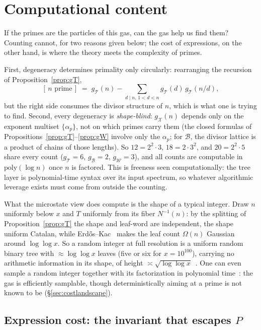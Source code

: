 \documentclass[11pt]{article}
\newcommand{\cT}{\mathcal{T}}   %
\newcommand{\cW}{\mathcal{W}}   %
\newcommand{\cB}{\mathcal{B}}   %
\numberwithin{equation}{section}
\theoremstyle{plain}
\theoremstyle{definition}
\theoremstyle{remark}
\begin{document}
\section{Computational content}\label{sec:comp}

If the primes are the particles of this gas, can the gas help us find them?
Counting cannot, for two reasons given below; the cost of expressions, on the other
hand, is where the theory meets the complexity of primes.

First, degeneracy determines
primality only circularly: rearranging the recursion of Proposition~\ref{prop:gT},
\[
[\,n \text{ prime}\,] \;=\; g_\cT(n) - \sum_{d \mid n,\, 1<d<n} g_\cT(d)\,g_\cT(n/d),
\]
but the right side consumes the divisor structure of $n$, which is what one is trying
to find. Second, every degeneracy is \emph{shape-blind}: $g_{\mathcal X}(n)$ depends
only on the exponent multiset $\{\alpha_p\}$, not on which primes carry them (the
closed formulas of Propositions~\ref{prop:gT}--\ref{prop:gW} involve only the
$\alpha_p$; for $\cB$, the divisor lattice is a product of chains of those lengths).
So $12 = 2^2\cdot 3$, $18 = 2\cdot 3^2$, and $20 = 2^2\cdot 5$ share every count
($g_\cT = 6$, $g_\cB = 2$, $g_\cW = 3$), and all counts are computable in
$\mathrm{poly}(\log n)$ once $n$ is factored. This is freeness seen computationally:
the tree layer is polynomial-time syntax over its input spectrum, so whatever
algorithmic leverage exists must come from outside the counting.

What the microstate view does compute is the shape of a typical integer. Draw
$n$ uniformly below $x$ and $T$ uniformly from its fiber $N^{-1}(n)$: by the
splitting of Proposition~\ref{prop:gT} the shape and leaf-word are independent, the
shape uniform Catalan, while Erd\H{o}s--Kac~\cite{erdoskac} makes the leaf count
$\Omega(n)$ Gaussian around $\log\log x$. So a random integer at full resolution is a
uniform random binary tree with $\approx \log\log x$ leaves (five or six for
$x = 10^{100}$), carrying no arithmetic information in its shape, of height
$\asymp \sqrt{\log\log x}$~\cite{flajoletodlyzko}. One can even sample a random
integer together with its factorization in polynomial time~\cite{bach,kalai}: the gas
is efficiently samplable, though deterministically aiming at a prime is not
known to be (\S\ref{sec:costlandscape}).

\subsection{Expression cost: the invariant that escapes $P$}\label{sec:cost}
\end{document}
